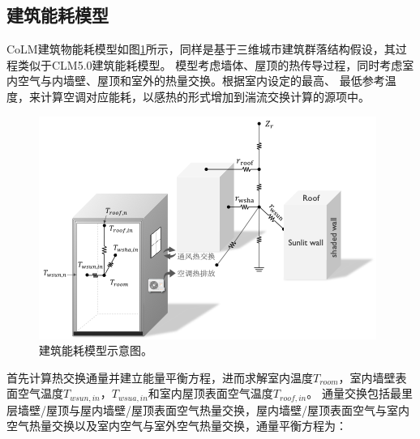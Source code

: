 \subsection{建筑能耗模型}
CoLM建筑物能耗模型如图\ref{fig:建筑能耗模型示意图}所示，同样是基于三维城市建筑群落结构假设，其过程类似于CLM5.0建筑能耗模型。
模型考虑墙体、屋顶的热传导过程，同时考虑室内空气与内墙壁、屋顶和室外的热量交换。根据室内设定的最高、
最低参考温度，来计算空调对应能耗，以感热的形式增加到湍流交换计算的源项中。
{
\begin{figure}[]
\centering
\includegraphics{Figures/城市模式/建筑能耗模型示意图.png}
\caption{建筑能耗模型示意图。}
\label{fig:建筑能耗模型示意图}
\end{figure}
}
首先计算热交换通量并建立能量平衡方程，进而求解室内温度$T_{room}$，室内墙壁表面空气温度$T_{wsun,in}$，$T_{wsua,in}$和室内屋顶表面空气温度$T_{roof,in}$。
通量交换包括最里层墙壁/屋顶与屋内墙壁/屋顶表面空气热量交换，屋内墙壁/屋顶表面空气与室内空气热量交换以及室内空气与室外空气热量交换，通量平衡方程为： 
